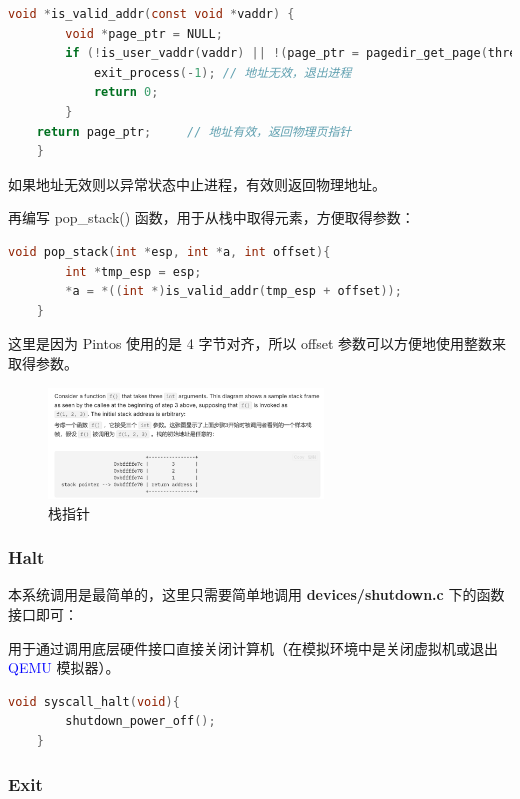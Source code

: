 \documentclass[14pt,a4paper,UTF8,twoside]{article}
\renewcommand{\texttt}[1]{\textcolor{blue}{\ttfamily #1}}
\begin{document}
\begin{lstlisting}[language=C, title= syscall\_create()]
    void *is_valid_addr(const void *vaddr) {
        void *page_ptr = NULL;
        if (!is_user_vaddr(vaddr) || !(page_ptr = pagedir_get_page(thread_current()->pagedir, vaddr))) {
            exit_process(-1); // 地址无效，退出进程
            return 0;
        }
    return page_ptr;     // 地址有效，返回物理页指针
    }
\end{lstlisting}

如果地址无效则以异常状态中止进程，有效则返回物理地址。

再编写 pop\_stack() 函数，用于从栈中取得元素，方便取得参数：

\begin{lstlisting}[language=C, title= pop\_stack()]
    void pop_stack(int *esp, int *a, int offset){
        int *tmp_esp = esp;
        *a = *((int *)is_valid_addr(tmp_esp + offset));
    }
\end{lstlisting}

这里是因为 Pintos 使用的是 4 字节对齐，所以 offset 参数可以方便地使用整数来取得参数。

\begin{figure}[H]
    \centering
    \includegraphics[width=0.65\textwidth]{img5/stackpointer.png}
    \caption{栈指针}
    \label{fig:stack}
\end{figure}

\subsubsection{Halt}

本系统调用是最简单的，这里只需要简单地调用 \textbf{devices/shutdown.c} 下的函数接口即可：

用于通过调用底层硬件接口直接关闭计算机（在模拟环境中是关闭虚拟机或退出 \texttt{QEMU} 模拟器）。

\begin{lstlisting}[language=C]
    void syscall_halt(void){
        shutdown_power_off();
    }
\end{lstlisting}

\subsubsection{Exit}
\end{document}

